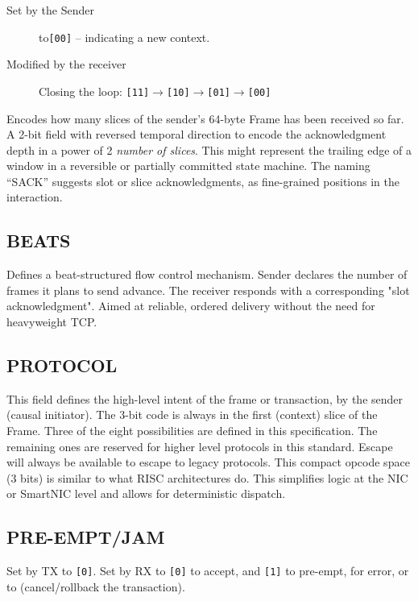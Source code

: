 \documentclass[../../../OAE-SPEC-MAIN.tex]{subfiles}
\begin{document}
\begin{description}
\item [Set by the Sender] to\texttt{[00]} --  indicating a  new context.
\item [Modified by the receiver] Closing the loop: \texttt{[11]$\rightarrow$[10]$\rightarrow$[01]$\rightarrow$[00]} %
\end{description}

Encodes how many slices of the sender’s 64-byte Frame has been received so far. A 2-bit field with reversed temporal direction to encode the acknowledgment depth in a power of 2 \emph{number of slices}. This might represent the trailing edge of a window in a reversible or partially committed state machine. The naming “SACK”  suggests  slot or slice acknowledgments, as fine-grained positions in the interaction. 


\subsection{BEATS}


Defines a beat-structured flow control mechanism.  Sender declares the number of frames it plans to send advance. The receiver responds with a corresponding "slot acknowledgment".  Aimed at reliable, ordered delivery without the need for heavyweight TCP.


\subsection{PROTOCOL}

This field defines the high-level intent of the frame or transaction, by the sender (causal initiator). The 3-bit code is always in the first (context) slice of the Frame. Three of the eight possibilities are defined in this specification. The remaining ones are reserved for higher level protocols in this standard.  Escape will always be available to escape to legacy protocols. This compact opcode space (3 bits) is similar to what RISC architectures do. This simplifies logic at the NIC or SmartNIC level and allows for deterministic dispatch.

\subsection{PRE-EMPT/JAM}


\nopagebreak[2]Set by TX to \texttt{[0]}. Set by RX to \texttt{[0]} to accept, and  \texttt{[1]} to pre-empt, for error, or to (cancel/rollback the transaction).
\end{document}
